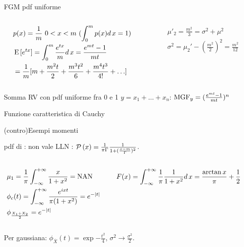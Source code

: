 \begin{wordonframe}{FGM pdf uniforme}
\begin{columns}[T]
\begin{column}{0.5\textwidth}
\begin{align*}
&p(x)=\frac{1}{m}\ 0<x<m\ (\int_0^mp(x)d\,x=1)\\
&\operatorname{E}{[e^{tx}]}=\int_0^m\frac{e^{tx}}{m}d\,x=\frac{e^{mt}-1}{mt}\\
&=\frac{1}{m}[m+\frac{m^2t}{2}+\frac{m^3t^2}{6}+\frac{m^4t^3}{4!}+\ldots]
\end{align*}
\end{column}
\begin{column}{0.5\textwidth}
\begin{align*}
&\mu'_2=\frac{m^2}{3}=\sigma^2+\mu^2\\
&\sigma^2=\mu_2'-(\frac{m^2}{2})^2=\frac{m^2}{12}
\end{align*}
\end{column}
\end{columns}
\begin{block}{Somma RV con pdf uniforme fra 0 e 1}
$y=x_1+\ldots+x_n$: $\operatorname{MGF}_y=(\frac{e^{mt}-1}{mt})^n$
\end{block}
\end{wordonframe}

\begin{wordonframe}{Funzione caratteristica di Cauchy}

\end{wordonframe}

\begin{wordonframe}{(contro)Esempi momenti}
\begin{block}{pdf di : non vale LLN}
: $\operatorname{\mathcal{P}}{(x)}=\frac{1}{\pi\Gamma}\frac{1}{1+(\frac{x-m}{\Gamma})^2}$.
\begin{columns}[T]
\begin{column}{0.5\textwidth}
\begin{align*}
&\mu_1=\frac{1}{\pi}\int_{-\infty}^{+\infty}{}\frac{x}{1+x^2}=\operatorname{NAN}{}\\
&\phi_c(t)=\int_{-\infty}^{+\infty}{}\frac{e^{ixt}}{\pi(1+x^2)}=e^{-|t|}\\
&\phi_{\frac{X_1+X_2}{2}}=e^{-|t|}
\end{align*}
\end{column}
\begin{column}{0.5\textwidth}
\begin{align*}
&F(x)=\int_{-\infty}^{+\infty}{}\frac{1}{\pi}\frac{1}{1+x^2}d\,x=\frac{\arctan{x}}{\pi}+\frac{1}{2}
\end{align*}
\end{column}
\end{columns}
Per gaussiana: $\phi_{\overline{X}}(t)=\exp{-\frac{t^2}{4}}$, $\sigma^2\to\frac{\sigma^2}{2}$.
\end{block}
\end{wordonframe}

